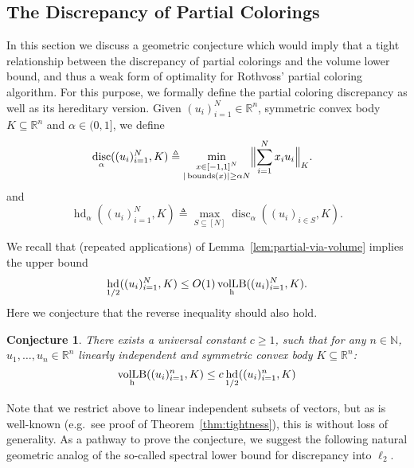 \documentclass[12pt]{article}
\newtheorem{conjecture}[theorem]{Conjecture}
\newcommand{\R}{{\mathbb{R}}}
\newcommand{\N}{{\mathbb{N}}}
\newcommand{\eqdef}{\triangleq}
\DeclareMathOperator{\vollb}{volLB}
\DeclareMathOperator{\disc}{disc}
\DeclareMathOperator{\hd}{hd}
\DeclareMathOperator{\bnds}{bounds}
\begin{document}
\subsection{The Discrepancy of Partial Colorings}

In this section we discuss a geometric conjecture which would imply that a tight
relationship between the discrepancy of partial colorings and the volume lower
bound, and thus a weak form of optimality for Rothvoss' partial coloring
algorithm. For this purpose, we formally define the partial coloring discrepancy
as well as its hereditary version. Given $(u_i)_{i=1}^N \in \R^n$, symmetric
convex body $K \subseteq \R^n$ and $\alpha \in (0,1]$,  we define  
\begin{equation}
\label{def:partial-disc}
\begin{split}
&\disc_\alpha(( u_i)_{i=1}^N,K) \eqdef \min_{\substack{x \in [-1,1]^N \\
|\bnds(x)| \geq \alpha N}} \Bigl\|\sum_{i=1}^N x_i u_i\Bigr\|_K .
\end{split}
\end{equation}
and
\begin{equation}
\label{def:partial-hd}
\hd_\alpha((u_i)_{i=1}^N,K) \eqdef \max_{S \subseteq [N]} \disc_\alpha((u_i)_{i \in S}, K) .
\end{equation}

We recall that (repeated applications) of Lemma~\ref{lem:partial-via-volume}
implies the upper bound
\[
\hd_{1/2}((u_i)_{i=1}^N,K) \leq O(1) \vollb_{\rm h}((u_i)_{i=1}^N,K).
\]
Here we conjecture that the reverse inequality should also hold.

\begin{conjecture}
\label{conj:partial-volume}
There exists a universal constant $c \geq 1$, such that for any $n \in \N$,
$u_1,\dots,u_n \in \R^n$ linearly independent and symmetric convex body $K
\subseteq \R^n$: 
\begin{equation}
\vollb_{\rm h}((u_i)_{i=1}^n,K) \leq c \hd_{1/2}((u_i)_{i=1}^n,K)
\end{equation}
\end{conjecture}

Note that we restrict above to linear independent subsets of vectors, but as is
well-known (e.g.~see proof of Theorem~\ref{thm:tightness}), this is without loss
of generality. As a pathway to prove the conjecture, we suggest the following
natural geometric analog of the so-called spectral lower bound for discrepancy
into $\ell_2$.
\end{document}
